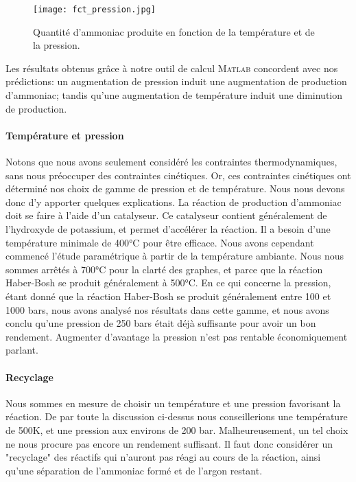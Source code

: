 \documentclass[11pt,a4paper]{report}
\begin{document}
\begin{figure}[ht!]
 \centering
 \texttt{[image: fct\_pression.jpg]}
 \caption{Quantité d'ammoniac produite en fonction de la température et de la pression.}
 \label{fct_pression}
\end{figure}

Les résultats obtenus grâce à notre outil de calcul \textsc{Matlab} concordent avec nos prédictions: un augmentation
de pression induit une augmentation de production d'ammoniac; tandis qu'une augmentation de température induit une 
diminution de production.

\paragraph{Température et pression}
Notons que nous avons seulement considéré les contraintes thermodynamiques, sans nous préoccuper des contraintes 
cinétiques. Or, ces contraintes cinétiques ont déterminé nos choix de gamme de pression et de température. Nous nous 
devons donc d'y apporter quelques explications.
La réaction de production d'ammoniac doit se faire à l'aide d'un catalyseur. Ce catalyseur contient généralement de 
l'hydroxyde de potassium, et permet d'accélérer la réaction. Il a besoin d'une température minimale de 400°C pour être 
efficace. Nous avons cependant commencé l'étude paramétrique à partir de la température ambiante. Nous nous sommes
arrêtés à 700°C pour la clarté des graphes, et parce que la réaction Haber-Bosh se produit généralement à 500°C. 
En ce qui concerne la pression, étant donné que la réaction Haber-Bosh se produit généralement entre 100 et 1000 bars,
nous avons analysé nos résultats dans cette gamme, et nous avons conclu qu'une pression de 250 bars était déjà 
suffisante pour avoir un bon rendement. Augmenter d'avantage la pression n'est pas rentable économiquement parlant.

\paragraph{Recyclage} Nous sommes en mesure de choisir un température et une pression favorisant la réaction. De par 
toute la discussion ci-dessus nous conseillerions une température de 500K, et une pression aux environs de 200 bar. 
Malheureusement, un tel choix ne nous procure  pas encore un rendement suffisant. Il faut donc considérer un 
"recyclage" des réactifs qui n'auront pas réagi au cours de la réaction, ainsi qu'une séparation de l'ammoniac 
formé et de l'argon restant.
\end{document}
